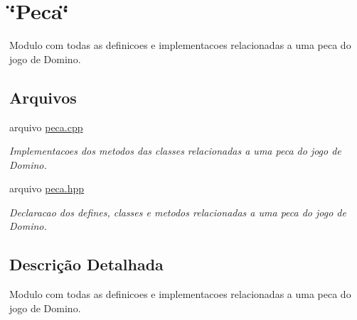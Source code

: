 \hypertarget{group__MOD__PECA}{
\section{\char`\"{}Peca\char`\"{}}
\label{group__MOD__PECA}
}


Modulo com todas as definicoes e implementacoes relacionadas a uma peca do jogo de Domino.  


\subsection*{Arquivos}
\begin{DoxyCompactItemize}
\item 
arquivo \hyperlink{peca_8cpp}{peca.cpp}


\begin{DoxyCompactList}\small\item\em Implementacoes dos metodos das classes relacionadas a uma peca do jogo de Domino. \item\end{DoxyCompactList}

\item 
arquivo \hyperlink{peca_8hpp}{peca.hpp}


\begin{DoxyCompactList}\small\item\em Declaracao dos defines, classes e metodos relacionadas a uma peca do jogo de Domino. \item\end{DoxyCompactList}

\end{DoxyCompactItemize}


\subsection{Descrição Detalhada}
Modulo com todas as definicoes e implementacoes relacionadas a uma peca do jogo de Domino. 